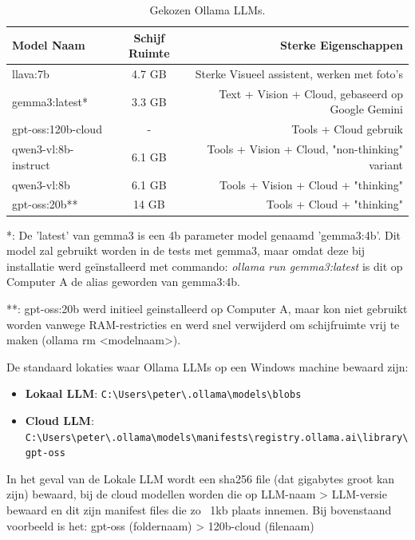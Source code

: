 \begin{table}[H]
    \centering
    \begin{tabular}{lcr}
        \toprule
        \textbf{Model Naam} & \textbf{Schijf Ruimte} & \textbf{Sterke Eigenschappen} \\
        \midrule
llava:7b                & 4.7 GB    &    Sterke Visueel assistent, werken met foto's \\
gemma3:latest*          & 3.3 GB    &    Text + Vision + Cloud, gebaseerd op Google Gemini \\
gpt-oss:120b-cloud      & -         &    Tools + Cloud gebruik \\
qwen3-vl:8b-instruct    & 6.1 GB    &    Tools + Vision + Cloud, "non-thinking" variant \\
qwen3-vl:8b             & 6.1 GB    &    Tools + Vision + Cloud + "thinking" \\
gpt-oss:20b**           & 14  GB    &    Tools + Cloud + "thinking" \\
        \bottomrule
    \end{tabular}
    \caption[Gekozen Ollamallms]{\label{tab:gekozenollamallms}Gekozen Ollama LLMs.}
\end{table}


*: De 'latest' van gemma3 is een 4b parameter model genaamd 'gemma3:4b'. Dit model zal gebruikt worden in de tests met gemma3, maar omdat deze bij installatie werd geïnstalleerd met commando: \textit{ollama run gemma3:latest} is dit op Computer A de alias geworden van gemma3:4b.

**: gpt-oss:20b werd initieel geinstalleerd op Computer A, maar kon niet gebruikt worden vanwege RAM-restricties en werd snel verwijderd om schijfruimte vrij te maken (ollama rm <modelnaam>).

De standaard lokaties waar Ollama LLMs op een Windows machine bewaard zijn:

\begin{itemize}
    \item \textbf{Lokaal LLM}: \verb|C:\Users\peter\.ollama\models\blobs|
    \item \textbf{Cloud LLM}: \\ \verb|C:\Users\peter\.ollama\models\manifests\registry.ollama.ai\library\gpt-oss|
\end{itemize}

In het geval van de Lokale LLM wordt een sha256 file (dat gigabytes groot kan zijn) bewaard, bij de cloud modellen worden die op LLM-naam > LLM-versie bewaard en dit zijn manifest files die zo ~1kb plaats innemen.
Bij bovenstaand voorbeeld is het: gpt-oss (foldernaam) > 120b-cloud (filenaam)

